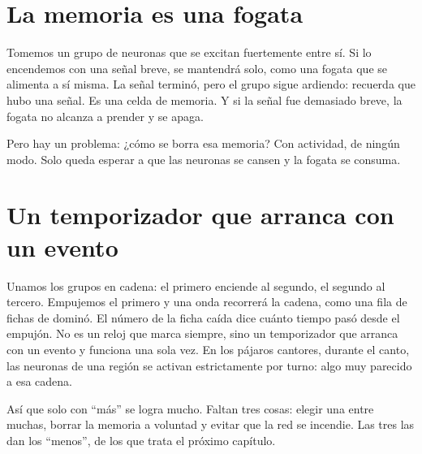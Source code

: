 
\section*{La memoria es una fogata}

Tomemos un grupo de neuronas que se excitan fuertemente entre sí. Si lo encendemos con una señal breve, se mantendrá solo, como una fogata que se alimenta a sí misma. La señal terminó, pero el grupo sigue ardiendo: recuerda que hubo una señal. Es una celda de memoria. Y si la señal fue demasiado breve, la fogata no alcanza a prender y se apaga.

Pero hay un problema: ¿cómo se borra esa memoria? Con actividad, de ningún modo. Solo queda esperar a que las neuronas se cansen y la fogata se consuma.

\section*{Un temporizador que arranca con un evento}

Unamos los grupos en cadena: el primero enciende al segundo, el segundo al tercero. Empujemos el primero y una onda recorrerá la cadena, como una fila de fichas de dominó. El número de la ficha caída dice cuánto tiempo pasó desde el empujón. No es un reloj que marca siempre, sino un temporizador que arranca con un evento y funciona una sola vez. En los pájaros cantores, durante el canto, las neuronas de una región se activan estrictamente por turno: algo muy parecido a esa cadena.

Así que solo con “más” se logra mucho. Faltan tres cosas: elegir una entre muchas, borrar la memoria a voluntad y evitar que la red se incendie. Las tres las dan los “menos”, de los que trata el próximo capítulo.

